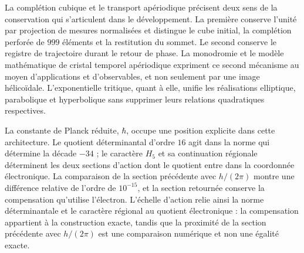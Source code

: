 La complétion cubique et le transport apériodique précisent deux sens
de la conservation qui s'articulent dans le développement. La première conserve
l'unité par projection de mesures normalisées et distingue le cube
initial, la complétion perforée de \(999\) éléments et la restitution
du sommet. Le second conserve le registre de trajectoire durant le
retour de phase. La monodromie et le modèle mathématique de cristal temporel
apériodique expriment ce second mécanisme au moyen d'applications et
d'observables, et non seulement par une image hélicoïdale. L'exponentielle
tritique, quant à elle, unifie les réalisations elliptique, parabolique et
hyperbolique sans supprimer leurs relations quadratiques respectives.

La constante de Planck réduite, \(\hbar\), occupe une position explicite dans cette architecture. Le quotient déterminantal d'ordre \(16\) agit dans la norme qui détermine la décade \(-34\) ; le caractère \(H_5\) et sa continuation régionale déterminent les deux sections d'action dont le quotient entre dans la coordonnée électronique. La comparaison de la section précédente avec \(h/(2\pi)\) montre une différence relative de l'ordre de \(10^{-15}\), et la section retournée conserve la compensation qu'utilise l'électron. L'échelle d'action relie ainsi la norme déterminantale et le caractère régional au quotient électronique : la compensation appartient à la construction exacte, tandis que la proximité de la section précédente avec \(h/(2\pi)\) est une comparaison numérique et non une égalité exacte.
